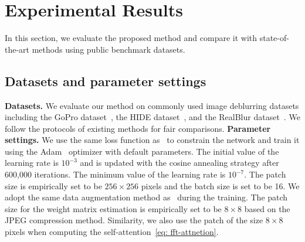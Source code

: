 \documentclass[10pt,twocolumn,letterpaper]{article}
\begin{document}
\section{Experimental Results}
\label{sec:experiment}
In this section, we evaluate the proposed method and compare it with state-of-the-art methods using public benchmark datasets.
\subsection{Datasets and parameter settings}
{\flushleft \textbf{Datasets.}}
We evaluate our method on commonly used image deblurring datasets including the GoPro dataset~\cite{GoPro}, the HIDE dataset~\cite{HIDE}, and the RealBlur dataset~\cite{Realblur}.
We follow the protocols of existing methods for fair comparisons.
{\flushleft \textbf{Parameter settings.}}
We use the same loss function as~\cite{MIMO} to constrain the network and train it using the Adam~\cite{Adam} optimizer with default parameters.
The initial value of the learning rate is $10^{-3}$ and is updated with the cosine annealing strategy after 600,000 iterations. The minimum value of the learning rate is $10^{-7}$.
The patch size is empirically set to be $256\times 256$ pixels and the batch size is set to be 16.
We adopt the same data augmentation method as~\cite{Restormer} during the training.
The patch size for the weight matrix estimation is empirically set to be $8\times 8$ based on the JPEG compression method.
Similarity, we also use the patch of the size $8\times 8$ pixels when computing the self-attention~\eqref{eq: fft-attnetion}.
\end{document}
